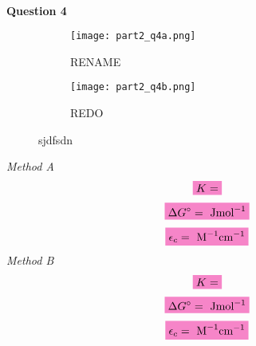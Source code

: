 \\
\textbf{Question 4}
\begin{figure}[H]
     \centering
     \begin{subfigure}[b]{0.49\textwidth}
         \centering
         \texttt{[image: part2\_q4a.png]}
         \caption{RENAME}
         \label{fig:part2_q4_a}
     \end{subfigure}
     \hfill
     \begin{subfigure}[b]{0.49\textwidth}
         \centering
         \texttt{[image: part2\_q4b.png]}
         \caption{REDO}
         \label{fig:part2_q4_b}
     \end{subfigure}
     \caption{sjdfsdn}
     \label{fig:part2q4}
\end{figure}

\noindent \textit{Method A}
\begin{equation*}
    \mathcolorbox{Lavender}{K = }
\end{equation*}
\begin{equation*}
    \mathcolorbox{Lavender}{\Delta G^{\circ} =  \text{ Jmol}^{-1}}
\end{equation*}
\begin{equation*}
    \mathcolorbox{Lavender}{\epsilon_c = \text{ M}^{-1}\text{cm} ^ {-1}}
\end{equation*}
\textit{Method B}
\begin{equation*}
    \mathcolorbox{Lavender}{K = }
\end{equation*}
\begin{equation*}
    \mathcolorbox{Lavender}{\Delta G^{\circ} =  \text{ Jmol}^{-1}}
\end{equation*}
\begin{equation*}
    \mathcolorbox{Lavender}{\epsilon_c = \text{ M}^{-1}\text{cm} ^ {-1}}
\end{equation*}